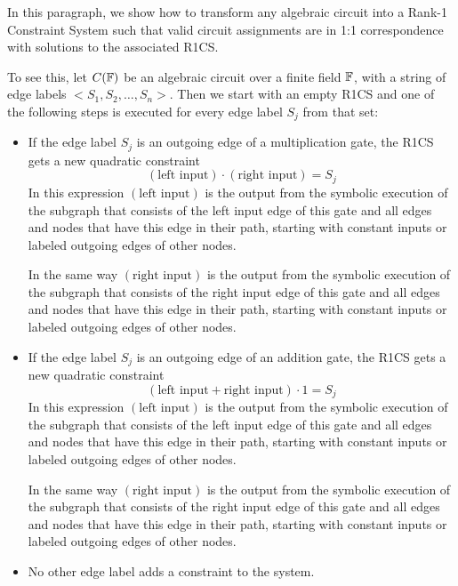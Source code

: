 In this paragraph, we show how to transform any algebraic circuit into a Rank-1 Constraint System such that valid circuit assignments are in 1:1 correspondence with solutions to the associated R1CS. 

To see this, let $C(\mathbb{F})$ be an algebraic circuit over a finite field $\mathbb{F}$, with a string of edge labels $<S_1,S_2,\ldots, S_n>$. Then we start with an empty R1CS and one of the following steps is executed for every edge label $S_j$ from that set:
\begin{itemize}
\label{algebraic-gates}
\item If the edge label $S_j$ is an outgoing edge of a multiplication gate, the R1CS gets a new quadratic constraint
\begin{equation}
(\text{left input})\cdot (\text{right input}) = S_j
\end{equation} 
In this expression $(\text{left input})$ is the output from the symbolic execution of the subgraph that consists of the left input edge of this gate and all edges and nodes that have  this edge in their path, starting with constant inputs or labeled outgoing edges of other nodes. 

In the same way $(\text{right input})$ is the output from the symbolic execution of the subgraph that consists of the right input edge of this gate and all edges and nodes that have this edge in their path, starting with constant inputs or labeled outgoing edges of other nodes.
\item If the edge label $S_j$ is an outgoing edge of an addition gate, the R1CS gets a new quadratic constraint
\begin{equation}
(\text{left input} + \text{right input})\cdot 1 = S_j
\end{equation}  
In this expression $(\text{left input})$ is the output from the symbolic execution of the subgraph that consists of the left input edge of this gate and all edges and nodes that have  this edge in their path, starting with constant inputs or labeled outgoing edges of other nodes. 

In the same way $(\text{right input})$ is the output from the symbolic execution of the subgraph that consists of the right input edge of this gate and all edges and nodes that have this edge in their path, starting with constant inputs or labeled outgoing edges of other nodes.
\item No other edge label adds a constraint to the system.
\end{itemize}

